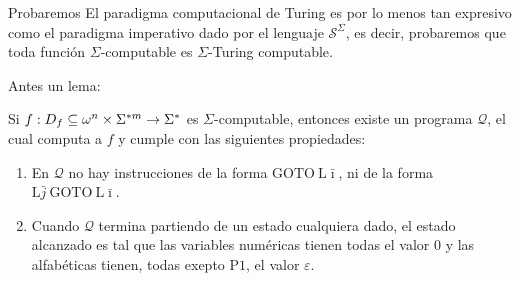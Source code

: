 \begin{frame}
  \begin{alertblock}{Probaremos}
    \PN El paradigma computacional de Turing es por lo menos tan expresivo como el paradigma imperativo dado por el
    lenguaje $\mathcal{S}^{\Sigma}$, es decir, probaremos que toda función $\Sigma$-computable es $\Sigma$-Turing
    computable.
  \end{alertblock}

  \PN Antes un lema:
  \begin{lemma}
    \PN Si $f: D_{f} \subseteq \omega^{n}\times \Sigma^{\ast m} \rightarrow \Sigma^{\ast}$ es $\Sigma$-computable, entonces
    existe un programa $\mathcal{Q}$, el cual computa a $f$ y cumple con las siguientes propiedades:
    \begin{enumerate}[1)]
      \item En $\mathcal{Q}$ no hay instrucciones de la forma $\mathrm{GOTO} \ \mathrm{L}\bar{\imath}$, ni de la forma
      $\mathrm{L}\bar{j} \ \mathrm{GOTO} \ \mathrm{L}\bar{\imath}$.

      \item Cuando $\mathcal{Q}$ termina partiendo de un estado cualquiera dado, el estado alcanzado es tal que las
      variables numéricas tienen todas el valor $0$ y las alfabéticas tienen, todas exepto $\mathrm{P}1$, el valor
      $\varepsilon$.
    \end{enumerate}
  \end{lemma}
\end{frame}
